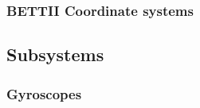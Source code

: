 \subsubsection{BETTII Coordinate systems}


\begin{figure}[!ht]
	\centering
	
	\caption[BETTII coordinate systems]{}
	\label{fig:CoordinateSystem}
    \end{figure}

    
% 	


\begin{figure}[!ht]
	\centering
	
	\caption[The celestial sphere]{}
	\label{fig:celestialSphere}
    \end{figure}

\begin{figure}[!ht]
	\centering
	
	\caption[The star camera reference frame]{}
	\label{fig:starcamRefFrame}
    \end{figure}


\subsection{Subsystems}



\subsubsection{Gyroscopes}
\label{subsec:gyros}


